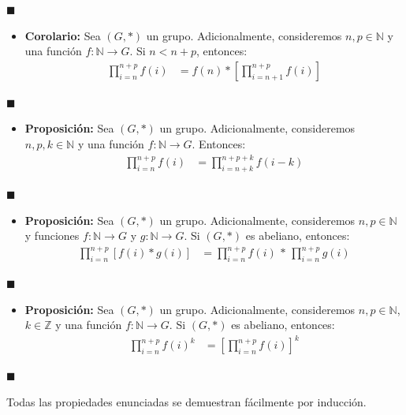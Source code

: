 \documentclass[10 pt]{article}
\begin{document}
\begin{flushright}
    $\blacksquare$
\end{flushright}

\begin{itemize}
    \item \Large{\textbf{Corolario:} Sea $(G,*)$ un grupo. Adicionalmente, consideremos $n,p \in \mathbb N$ y una función $f:\mathbb N \rightarrow G$. Si $n<n+p$, entonces:}
    \begin{align*}
        \prod_{i=n}^{n+p}f(i)&=f(n)*\left[\prod_{i=n+1}^{n+p}f(i)\right]
    \end{align*}
\end{itemize}

\begin{flushright}
    $\blacksquare$
\end{flushright}

\begin{itemize}
    \item \Large{\textbf{Proposición:} Sea $(G,*)$ un grupo. Adicionalmente, consideremos $n,p,k \in \mathbb N$ y una función $f:\mathbb N \rightarrow G$. Entonces:}
    \begin{align*}
        \prod_{i=n}^{n+p}f(i)&=\prod_{i=n+k}^{n+p+k}f(i-k)
    \end{align*}
\end{itemize}

\begin{flushright}
    $\blacksquare$
\end{flushright}

\begin{itemize}
    \item \Large{\textbf{Proposición:} Sea $(G,*)$ un grupo. Adicionalmente, consideremos $n,p \in \mathbb N$ y funciones $f:\mathbb N \rightarrow G$ y $g:\mathbb N \rightarrow G$. Si $(G,*)$ es abeliano, entonces:}
    \begin{align*}
        \prod_{i=n}^{n+p}[f(i)*g(i)]&=\prod_{i=n}^{n+p}f(i) \, * \, \prod_{i=n}^{n+p}g(i)
    \end{align*}
\end{itemize}

\begin{flushright}
    $\blacksquare$
\end{flushright}

\begin{itemize}
    \item \Large{\textbf{Proposición:} Sea $(G,*)$ un grupo. Adicionalmente, consideremos $n,p \in \mathbb N$, $k \in \mathbb Z$ y una función $f:\mathbb N \rightarrow G$. Si $(G,*)$ es abeliano, entonces:}
    \begin{align*}
        \prod_{i=n}^{n+p}f(i)^k&=\left[\prod_{i=n}^{n+p}f(i) \right]^k
    \end{align*}
\end{itemize}

\begin{flushright}
    $\blacksquare$
\end{flushright}

\Large{Todas las propiedades enunciadas se demuestran fácilmente por inducción.} \\
\end{document}
